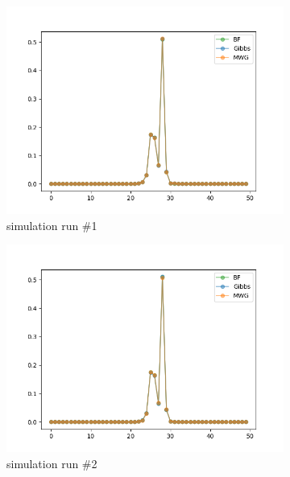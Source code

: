 \begin{figure}[H]
    \centering
    \begin{subfigure}{.3\textwidth}
    	\centering
        \includegraphics[width=\linewidth]{../../plots/Posterior_post_burnin_M2_N50_NMCMC1_seed0_diffind2.png}
        \caption{simulation run \#1}
    \end{subfigure}
    \begin{subfigure}{.3\textwidth}
        \centering
    	\includegraphics[width=\linewidth]{../../plots/Posterior_post_burnin_M2_N50_NMCMC1_seed1_diffind2.png}
    	\caption{simulation run \#2}
	\end{subfigure}
	\begin{subfigure}{.3\textwidth}

\end{subfigure}
\end{figure}
